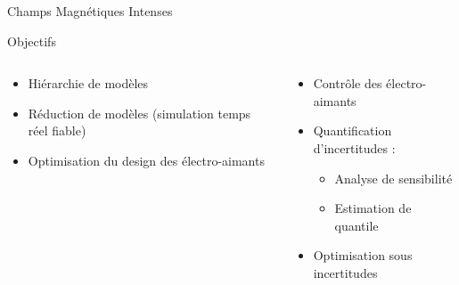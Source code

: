 \begin{frame}{Champs Magnétiques Intenses}
  \begin{block}{Objectifs}
    \begin{columns}[c]
      \begin{small}
        \begin{itemize}
        \item Hiérarchie de modèles
        \item Réduction de modèles (simulation temps réel fiable)
        \item Optimisation du design des électro-aimants
        \end{itemize}
      \end{small}
      \begin{small}
        \begin{itemize}
        \item Contrôle  des électro-aimants
        \item Quantification d'incertitudes :
          \begin{itemize}
          \item Analyse de sensibilité
          \item Estimation de quantile
          \end{itemize}
        \item Optimisation sous incertitudes
        \end{itemize}
      \end{small}
    \end{columns}
  \end{block}
  

\end{frame}
